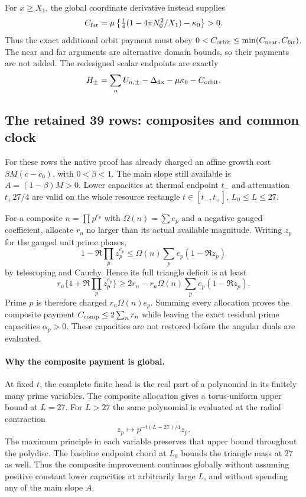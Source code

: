 \documentclass[11pt,a4paper]{article}
\theoremstyle{definition}
\theoremstyle{remark}
\begin{document}
For $x\ge X_1$, the global coordinate derivative instead supplies
\[
 C_{\rm far}=\mu\left\{\tfrac14(1-4\pi N_0^2/X_1)-\kappa_0\right\}>0.
\]
Thus the exact additional orbit payment must obey
$0<C_{\rm orbit}\le\min(C_{\rm near},C_{\rm far})$.
The near and far arguments are alternative domain bounds, so their
payments are not added. The redesigned scalar endpoints are exactly
\[
 H_\pm=\sum_nU_{n,\pm}-\Delta_{\rm fix}
                  -\mu\kappa_0-C_{\rm orbit}.
\]

\subsection{The retained 39 rows: composites and common clock}

For these rows the native proof has already charged an affine growth
cost $\beta M(c-c_0)$, with $0<\beta<1$. The main slope still available
is $A=(1-\beta)M>0$. Lower capacities at thermal endpoint $t_-$ and
attenuation $t_+27/4$ are valid on the whole resource rectangle
$t\in[t_-,t_+]$, $L_0\le L\le27$.

For a composite $n=\prod p^{e_p}$ with $\Omega(n)=\sum e_p$ and a
negative gauged coefficient, allocate $r_n$ no larger than its actual
available magnitude. Writing $z_p$ for the gauged unit prime phases,
\[
 1-\Re\prod_pz_p^{e_p}
 \le\Omega(n)\sum_pe_p(1-\Re z_p)
\]
by telescoping and Cauchy. Hence its full triangle deficit is at least
\[
 r_n\{1+\Re\prod_pz_p^{e_p}\}
 \ge2r_n-r_n\Omega(n)\sum_pe_p(1-\Re z_p).
\]
Prime $p$ is therefore charged $r_n\Omega(n)e_p$. Summing every
allocation proves the composite payment $C_{\rm comp}\le2\sum_nr_n$
while leaving the exact residual prime capacities
$\alpha_p>0$. These capacities are not restored before the angular
duals are evaluated.

\paragraph{Why the composite payment is global.}
At fixed $t$, the complete finite head is the real part of a polynomial
in its finitely many prime variables. The composite allocation gives a
torus-uniform upper bound at $L=27$. For $L>27$ the same polynomial is
evaluated at the radial contraction
\[
 z_p\longmapsto p^{-t(L-27)/4}z_p.
\]
The maximum principle in each variable preserves that upper bound
throughout the polydisc. The baseline endpoint chord at $L_0$ bounds
the triangle mass at $27$ as well. Thus the composite improvement
continues globally without assuming positive constant lower capacities
at arbitrarily large $L$, and without spending any of the main slope $A$.
\end{document}
